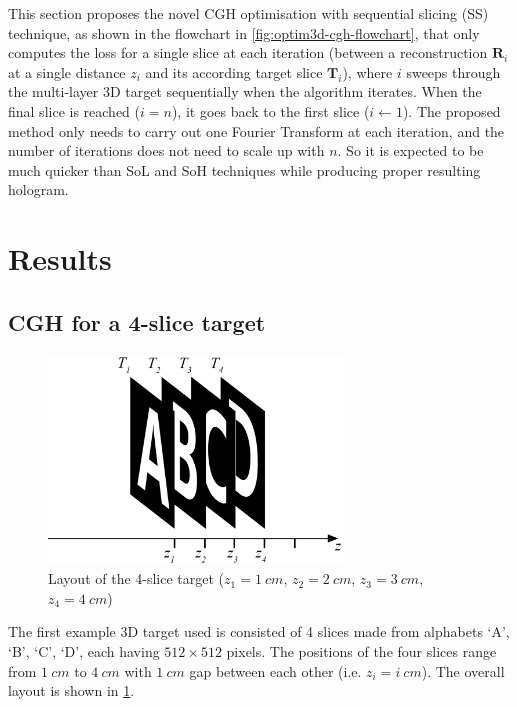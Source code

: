 This section proposes the novel CGH optimisation with sequential slicing (SS) technique, as shown in the flowchart in \cref{fig:optim3d-cgh-flowchart}, that only computes the loss for a single slice at each iteration (between a reconstruction $\textbf{R}_i$ at a single distance $z_i$ and its according target slice $\textbf{T}_i$), where $i$ sweeps through the multi-layer 3D target sequentially when the algorithm iterates. When the final slice is reached ($i=n$), it goes back to the first slice ($i \gets 1$). The proposed method only needs to carry out one Fourier Transform at each iteration, and the number of iterations does not need to scale up with $n$. So it is expected to be much quicker than SoL and SoH techniques while producing proper resulting hologram.








\section{Results}
\subsection{CGH for a 4-slice target}

\begin{figure}[H]
	\centering
	\includegraphics[width=0.7\textwidth]{Fresnel_slice_ABCD}
	\caption{Layout of the 4-slice target ($z_1=1\ cm$, $z_2=2\ cm$, $z_3=3\ cm$, $z_4=4\ cm$)}
	\label{fig:Fresnel_slice_ABCD}
\end{figure}

The first example 3D target used is consisted of 4 slices made from alphabets `A', `B', `C', `D', each having $512\times512$ pixels. The positions of the four slices range from $1\ cm$ to $4\ cm$ with $1\ cm$ gap between each other (i.e. $z_i=i\ cm$). The overall layout is shown in \cref{fig:Fresnel_slice_ABCD}.

